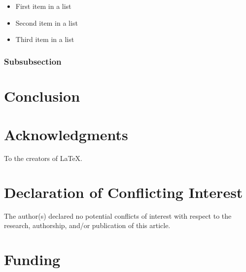 \documentclass[fleqn,10pt]{JLA_article} %
\begin{document}
\lipsum[13] %

\begin{itemize}[noitemsep] %
\item First item in a list
\item Second item in a list
\item Third item in a list
\end{itemize}

\subsubsection{Subsubsection}

\lipsum[14] %

\section{Conclusion}

\lipsum[15] %

\section*{Acknowledgments} %

To the creators of  \LaTeX.


\section*{Declaration of Conflicting Interest} %


The author(s) declared no potential conflicts of interest with respect to the research, authorship, and/or publication of this article.

\section*{Funding} %
\end{document}
